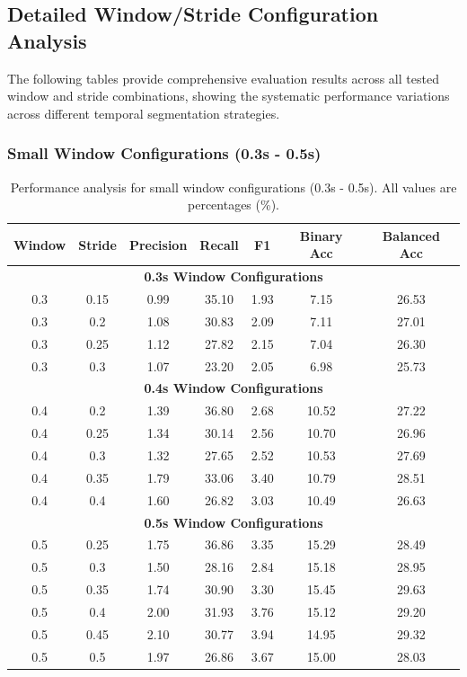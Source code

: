 \documentclass[11pt]{article}
\begin{document}
\subsection{Detailed Window/Stride Configuration Analysis}
The following tables provide comprehensive evaluation results across all tested window and stride combinations, showing the systematic performance variations across different temporal segmentation strategies.

\subsubsection{Small Window Configurations (0.3s - 0.5s)}

\begin{table}[H]
    \caption{Performance analysis for small window configurations (0.3s - 0.5s). All values are percentages (\%).}
    \centering
    \label{tab:small-window-configs}
    \footnotesize
    \begin{tabular}{|c|c|c|c|c|c|c|}
        \hline
        \textbf{Window} & \textbf{Stride} & \textbf{Precision} & \textbf{Recall} & \textbf{F1} & \textbf{Binary Acc} & \textbf{Balanced Acc} \\
        \hline
        \multicolumn{7}{|c|}{\textbf{0.3s Window Configurations}} \\
        \hline
        0.3 & 0.15 & 0.99 & 35.10 & 1.93 & 7.15 & 26.53 \\
        0.3 & 0.2 & 1.08 & 30.83 & 2.09 & 7.11 & 27.01 \\
        0.3 & 0.25 & 1.12 & 27.82 & 2.15 & 7.04 & 26.30 \\
        0.3 & 0.3 & 1.07 & 23.20 & 2.05 & 6.98 & 25.73 \\
        \hline
        \multicolumn{7}{|c|}{\textbf{0.4s Window Configurations}} \\
        \hline
        0.4 & 0.2 & 1.39 & 36.80 & 2.68 & 10.52 & 27.22 \\
        0.4 & 0.25 & 1.34 & 30.14 & 2.56 & 10.70 & 26.96 \\
        0.4 & 0.3 & 1.32 & 27.65 & 2.52 & 10.53 & 27.69 \\
        0.4 & 0.35 & 1.79 & 33.06 & 3.40 & 10.79 & 28.51 \\
        0.4 & 0.4 & 1.60 & 26.82 & 3.03 & 10.49 & 26.63 \\
        \hline
        \multicolumn{7}{|c|}{\textbf{0.5s Window Configurations}} \\
        \hline
        0.5 & 0.25 & 1.75 & 36.86 & 3.35 & 15.29 & 28.49 \\
        0.5 & 0.3 & 1.50 & 28.16 & 2.84 & 15.18 & 28.95 \\
        0.5 & 0.35 & 1.74 & 30.90 & 3.30 & 15.45 & 29.63 \\
        0.5 & 0.4 & 2.00 & 31.93 & 3.76 & 15.12 & 29.20 \\
        0.5 & 0.45 & 2.10 & 30.77 & 3.94 & 14.95 & 29.32 \\
        0.5 & 0.5 & 1.97 & 26.86 & 3.67 & 15.00 & 28.03 \\
        \hline
    \end{tabular}
\end{table}
\end{document}
